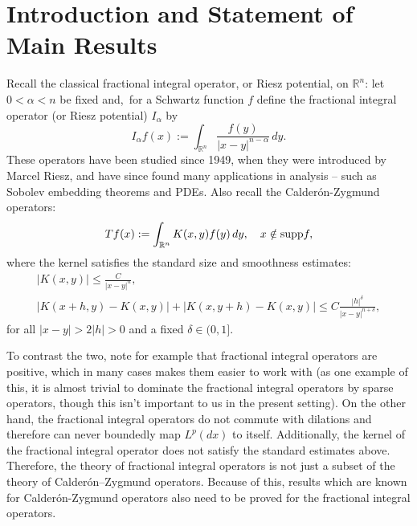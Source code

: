 \documentclass[12pt]{amsart}
\begin{document}
\maketitle
\setcounter{tocdepth}{1}
\tableofcontents

\section{Introduction and Statement of Main Results}

Recall the classical fractional integral operator, or Riesz potential, on $\mathbb{R}^n$:
let $0 < \alpha < n$ be fixed and,\ for a Schwartz function $f$ define the 
fractional integral operator (or Riesz potential) $I_{\alpha}$ by
	$$I_{\alpha}f(x) 
	:= \int_{{\mathbb{R}}^n} \frac{f(y)}{|x-y|^{n-\alpha}} \,dy.$$
These operators have been studied since 1949, when they were introduced by Marcel Riesz, and have since found many applications in analysis -- such as Sobolev embedding theorems and PDEs.
Also recall the Calder{\'o}n-Zygmund operators:
	$$Tf(x):=\int_{\mathbb{R}^n} K(x,y)f(y)\,dy,\quad x\notin\textnormal{supp} f,$$	
where the kernel satisfies the standard size and smoothness estimates:
 \begin{gather*}
 \left\vert K(x,y)\right\vert  \leq  \frac{C}{\left\vert x-y\right\vert^n}, \\
 \left\vert K(x+h,y)-K(x,y)\right\vert +\left\vert K(x,y+h)-K(x,y)\right\vert  \leq  C\frac{\left\vert h\right\vert^{\delta}}{\left\vert x-y\right\vert^{n+\delta}},
 \end{gather*}
 for all $\left\vert x-y\right\vert>2\left\vert h\right\vert>0$ and a fixed $\delta\in (0,1]$.

To contrast the two, note for example that fractional integral operators are positive, which in many cases 
makes them easier to work with (as one example of this, it is almost trivial
to dominate the fractional integral operators by sparse operators, though
this isn't important to us in the present setting). 
On the other hand, the fractional integral
operators do not commute with dilations and therefore can never boundedly map
$L^p(dx)$ to itself. Additionally, the kernel of the fractional integral
operator does not satisfy the standard estimates above. Therefore, the theory
of fractional integral operators is not just a subset of the theory of
Calder\'on--Zygmund operators. Because of this, results which are known
for Calder{\'o}n-Zygmund operators also need to be proved for the fractional
integral operators. 
	
\end{document}
